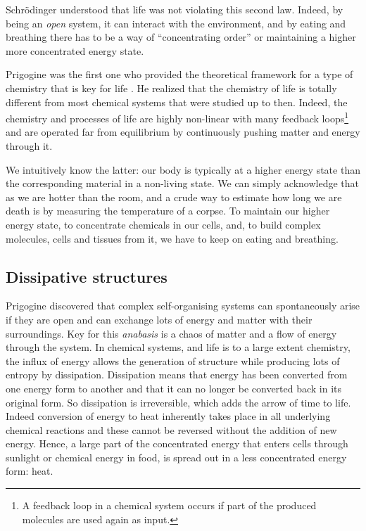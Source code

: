 \documentclass[
  11pt,
]{book}
\begin{document}
Schrödinger understood that life was not violating this second law. Indeed, by being an \emph{open} system, it can interact with the environment, and by eating and breathing there has to be a way of ``concentrating order'' or maintaining a higher more concentrated energy state.

Prigogine was the first one who provided the theoretical framework for a type of chemistry that is key for life \citep{prigogineStengers1984}. He realized that the chemistry of life is totally different from most chemical systems that were studied up to then. Indeed, the chemistry and processes of life are highly non-linear with many feedback loops\footnote{A feedback loop in a chemical system occurs if part of the produced molecules are used again as input.} and are operated far from equilibrium by continuously pushing matter and energy through it.

We intuitively know the latter: our body is typically at a higher energy state than the corresponding material in a non-living state. We can simply acknowledge that as we are hotter than the room, and a crude way to estimate how long we are death is by measuring the temperature of a corpse. To maintain our higher energy state, to concentrate chemicals in our cells, and, to build complex molecules, cells and tissues from it, we have to keep on eating and breathing.

\pagebreak

\hypertarget{dissipative-structures}{%
\subsection{Dissipative structures}\label{dissipative-structures}}

Prigogine discovered that complex self-organising systems can spontaneously arise if they are open and can exchange lots of energy and matter with their surroundings.
Key for this \emph{anabasis} is a chaos of matter and a flow of energy through the system.
In chemical systems, and life is to a large extent chemistry, the influx of energy allows the generation of structure while producing lots of entropy by dissipation. Dissipation means that energy has been converted from one energy form to another and that it can no longer be converted back in its original form. So dissipation is irreversible, which adds the arrow of time to life. Indeed conversion of energy to heat inherently takes place in all underlying chemical reactions and these cannot be reversed without the addition of new energy. Hence, a large part of the concentrated energy that enters cells through sunlight or chemical energy in food, is spread out in a less concentrated energy form: heat.
\end{document}
